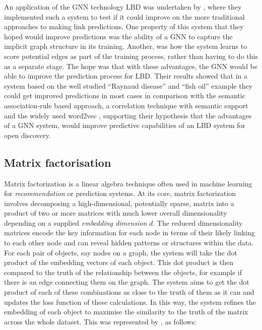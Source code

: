 \documentclass{l4proj}
\begin{document}
An application of the GNN technology LBD was undertaken by \cite{ding_exploring_2021}, where they implemented such a system to test if it could improve on the more traditional approaches to making link predictions. One property of this system that they hoped would improve predictions was the ability of a GNN to capture the implicit graph structure in its training. Another, was how the system learns to score potential edges as part of the training process, rather than having to do this as a separate stage. The hope was that with these advantages, the GNN would be able to improve the prediction process for LBD. Their results showed that in a system based on the well studied ``Raynaud disease'' and ``fish oil'' example they could get improved predictions in most cases in comparison with the semantic association-rule based approach, a correlation technique with semantic support and the widely used  word2vec \citep{mikolov_distributed_2013}, supporting their hypothesis that the advantages of a GNN system, would improve predictive capabilities of an LBD system for open discovery. \\

\subsection{Matrix factorisation}

Matrix factorization is a linear algebra technique often used in machine learning for \textit{recommendation} or prediction systems. At its core, matrix factorization involves decomposing a high-dimensional, potentially sparse, matrix into a product of two or more matrices with much lower overall dimensionality depending on a supplied \textit{embedding dimension} $d$. The reduced dimensionality matrices encode the key information for each node in terms of their likely linking to each other node and can reveal hidden patterns or structures within the data. For each pair of objects, say nodes on a graph, the system will take the dot product of the embedding vectors of each object. This dot product is then compared to the truth of the relationship between the objects, for example if there is an edge connecting them on the graph. The system aims to get the dot product of each of these combinations as close to the truth of them as it can and updates the loss function of these calculations. In this way, the system refines the embedding of each object to maximise the similarity to the truth of the matrix across the whole dataset. This was represented by \cite{matrix_fact}, as follows:\\
\end{document}
